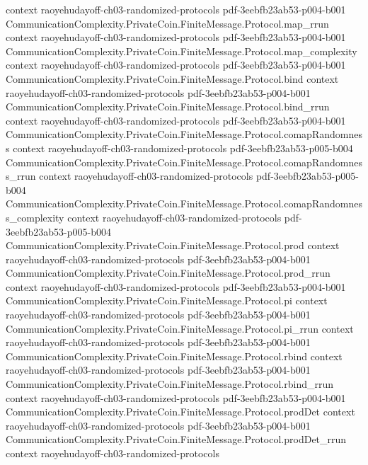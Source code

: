 \begin{theorem}
  {context}
  {raoyehudayoff-ch03-randomized-protocols}
  {pdf-3eebfb23ab53-p004-b001}
\proofstep
  {CommunicationComplexity.PrivateCoin.FiniteMessage.Protocol.map_rrun}
  {context}
  {raoyehudayoff-ch03-randomized-protocols}
  {pdf-3eebfb23ab53-p004-b001}
\proofstep
  {CommunicationComplexity.PrivateCoin.FiniteMessage.Protocol.map_complexity}
  {context}
  {raoyehudayoff-ch03-randomized-protocols}
  {pdf-3eebfb23ab53-p004-b001}
\proofstep
  {CommunicationComplexity.PrivateCoin.FiniteMessage.Protocol.bind}
  {context}
  {raoyehudayoff-ch03-randomized-protocols}
  {pdf-3eebfb23ab53-p004-b001}
\proofstep
  {CommunicationComplexity.PrivateCoin.FiniteMessage.Protocol.bind_rrun}
  {context}
  {raoyehudayoff-ch03-randomized-protocols}
  {pdf-3eebfb23ab53-p004-b001}
\proofstep
  {CommunicationComplexity.PrivateCoin.FiniteMessage.Protocol.comapRandomness}
  {context}
  {raoyehudayoff-ch03-randomized-protocols}
  {pdf-3eebfb23ab53-p005-b004}
\proofstep
  {CommunicationComplexity.PrivateCoin.FiniteMessage.Protocol.comapRandomness_rrun}
  {context}
  {raoyehudayoff-ch03-randomized-protocols}
  {pdf-3eebfb23ab53-p005-b004}
\proofstep
  {CommunicationComplexity.PrivateCoin.FiniteMessage.Protocol.comapRandomness_complexity}
  {context}
  {raoyehudayoff-ch03-randomized-protocols}
  {pdf-3eebfb23ab53-p005-b004}
\proofstep
  {CommunicationComplexity.PrivateCoin.FiniteMessage.Protocol.prod}
  {context}
  {raoyehudayoff-ch03-randomized-protocols}
  {pdf-3eebfb23ab53-p004-b001}
\proofstep
  {CommunicationComplexity.PrivateCoin.FiniteMessage.Protocol.prod_rrun}
  {context}
  {raoyehudayoff-ch03-randomized-protocols}
  {pdf-3eebfb23ab53-p004-b001}
\proofstep
  {CommunicationComplexity.PrivateCoin.FiniteMessage.Protocol.pi}
  {context}
  {raoyehudayoff-ch03-randomized-protocols}
  {pdf-3eebfb23ab53-p004-b001}
\proofstep
  {CommunicationComplexity.PrivateCoin.FiniteMessage.Protocol.pi_rrun}
  {context}
  {raoyehudayoff-ch03-randomized-protocols}
  {pdf-3eebfb23ab53-p004-b001}
\proofstep
  {CommunicationComplexity.PrivateCoin.FiniteMessage.Protocol.rbind}
  {context}
  {raoyehudayoff-ch03-randomized-protocols}
  {pdf-3eebfb23ab53-p004-b001}
\proofstep
  {CommunicationComplexity.PrivateCoin.FiniteMessage.Protocol.rbind_rrun}
  {context}
  {raoyehudayoff-ch03-randomized-protocols}
  {pdf-3eebfb23ab53-p004-b001}
\proofstep
  {CommunicationComplexity.PrivateCoin.FiniteMessage.Protocol.prodDet}
  {context}
  {raoyehudayoff-ch03-randomized-protocols}
  {pdf-3eebfb23ab53-p004-b001}
\proofstep
  {CommunicationComplexity.PrivateCoin.FiniteMessage.Protocol.prodDet_rrun}
  {context}
  {raoyehudayoff-ch03-randomized-protocols}

\end{theorem}
